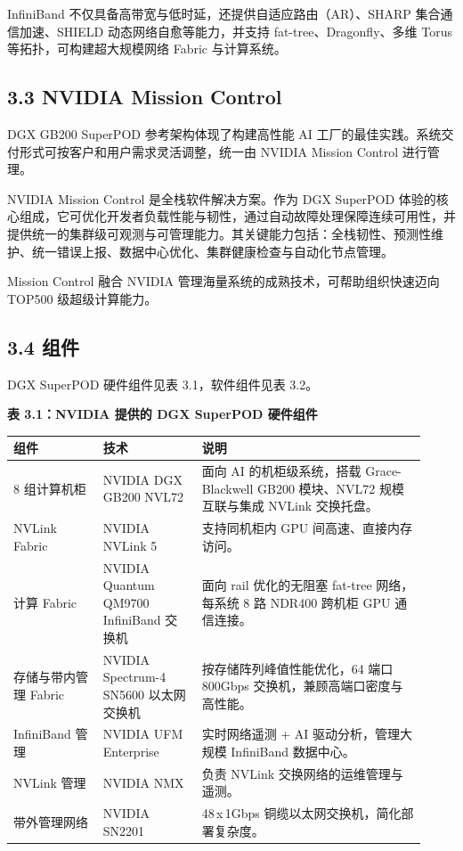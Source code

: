 \documentclass[10pt]{article}
\newcounter{none}
\begin{document}
InfiniBand 不仅具备高带宽与低时延，还提供自适应路由（AR）、SHARP 集合通信加速、SHIELD 动态网络自愈等能力，并支持 fat-tree、Dragonfly、多维 Torus 等拓扑，可构建超大规模网络 Fabric 与计算系统。

\subsection{3.3 NVIDIA Mission Control}
DGX GB200 SuperPOD 参考架构体现了构建高性能 AI 工厂的最佳实践。系统交付形式可按客户和用户需求灵活调整，统一由 NVIDIA Mission Control 进行管理。

NVIDIA Mission Control 是全栈软件解决方案。作为 DGX SuperPOD 体验的核心组成，它可优化开发者负载性能与韧性，通过自动故障处理保障连续可用性，并提供统一的集群级可观测与可管理能力。其关键能力包括：全栈韧性、预测性维护、统一错误上报、数据中心优化、集群健康检查与自动化节点管理。

Mission Control 融合 NVIDIA 管理海量系统的成熟技术，可帮助组织快速迈向 TOP500 级超级计算能力。

\subsection{3.4 组件}
DGX SuperPOD 硬件组件见表 3.1，软件组件见表 3.2。

\textbf{表 3.1：NVIDIA 提供的 DGX SuperPOD 硬件组件}

{\def\LTcaptype{none}
\begin{longtable}{|p{0.2\linewidth}|p{0.22\linewidth}|p{0.5\linewidth}|}
\hline
\textbf{组件} & \textbf{技术} & \textbf{说明} \\
\hline
8 组计算机柜 & NVIDIA DGX GB200 NVL72 & 面向 AI 的机柜级系统，搭载 Grace-Blackwell GB200 模块、NVL72 规模互联与集成 NVLink 交换托盘。 \\
\hline
NVLink Fabric & NVIDIA NVLink 5 & 支持同机柜内 GPU 间高速、直接内存访问。 \\
\hline
计算 Fabric & NVIDIA Quantum QM9700 InfiniBand 交换机 & 面向 rail 优化的无阻塞 fat-tree 网络，每系统 8 路 NDR400 跨机柜 GPU 通信连接。 \\
\hline
存储与带内管理 Fabric & NVIDIA Spectrum-4 SN5600 以太网交换机 & 按存储阵列峰值性能优化，64 端口 800Gbps 交换机，兼顾高端口密度与高性能。 \\
\hline
InfiniBand 管理 & NVIDIA UFM Enterprise & 实时网络遥测 + AI 驱动分析，管理大规模 InfiniBand 数据中心。 \\
\hline
NVLink 管理 & NVIDIA NMX & 负责 NVLink 交换网络的运维管理与遥测。 \\
\hline
带外管理网络 & NVIDIA SN2201 & 48\,x\,1Gbps 铜缆以太网交换机，简化部署复杂度。 \\
\hline
\end{longtable}
}
\end{document}
